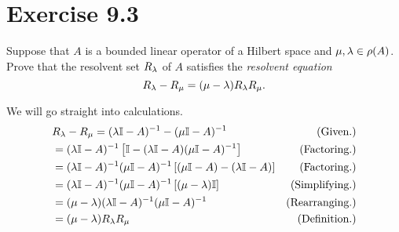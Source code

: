 \newpage
\section{Exercise 9.3}
Suppose that $A$ is a bounded linear operator of a Hilbert space and $\mu, \mathrm{\lambda} \in \rho(A)$. Prove that the resolvent set $R_{\mathrm{\lambda}}$ of $A$ satisfies the \textit{resolvent equation}
\[R_{\mathrm{\lambda}} - R_\mu = (\mu - \mathrm{\lambda}) R_{\mathrm{\lambda}} R_\mu.\]
\partbreak
\begin{solution}

    We will go straight into calculations.
    \tightalignbreak
    \begin{align*}
    &R_{\mathrm{\lambda}} - R_\mu = (\mathrm{\lambda}\mathbb{I} - A)^{-1} - (\mu\mathbb{I} - A)^{-1} &\text{(Given.)}\\
    &= (\mathrm{\lambda}\mathbb{I} - A)^{-1}\left[ \mathbb{I} - (\mathrm{\lambda}\mathbb{I} - A)(\mu\mathbb{I} - A)^{-1} \right] &\text{(Factoring.)}\\
    &= (\mathrm{\lambda}\mathbb{I} - A)^{-1}(\mu\mathbb{I} - A)^{-1} \left[ (\mu\mathbb{I} -A) - (\mathrm{\lambda}\mathbb{I} - A) \right] &\text{(Factoring.)}\\
    &= (\mathrm{\lambda}\mathbb{I} - A)^{-1}(\mu\mathbb{I} - A)^{-1} \left[ (\mu - \mathrm{\lambda})\mathbb{I}  \right] &\text{(Simplifying.)}\\
    &= (\mu - \mathrm{\lambda})(\mathrm{\lambda}\mathbb{I} - A)^{-1}(\mu\mathbb{I} - A)^{-1} &\text{(Rearranging.)}\\
    &= (\mu - \mathrm{\lambda})R_{\mathrm{\lambda}} R_\mu &\text{(Definition.)}
    \end{align*}
    \myendalignbreak
\end{solution}

\newpage
